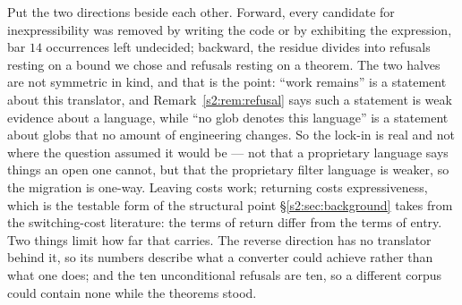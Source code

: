 Put the two directions beside each other. Forward, every candidate for inexpressibility was
removed by writing the code or by exhibiting the expression, bar $14$ occurrences left
undecided; backward, the residue divides into refusals resting on a bound we chose and
refusals resting on a theorem. The two halves are not symmetric in kind, and that is the
point: ``work remains'' is a statement about this translator, and
Remark~\ref{s2:rem:refusal} says such a statement is weak evidence about a language, while
``no glob denotes this language'' is a statement about globs that no amount of engineering
changes. So the lock-in is real and not where the question assumed it would be --- not that
a proprietary language says things an open one cannot, but that the proprietary filter
language is weaker, so the migration is one-way. Leaving costs work; returning costs
expressiveness, which is the testable form of the structural point
\S\ref{s2:sec:background} takes from the switching-cost literature: the terms of return
differ from the terms of entry. Two things limit how far that carries. The reverse direction
has no translator behind it, so its numbers describe what a converter could achieve rather
than what one does; and the ten unconditional refusals are ten, so a different corpus could
contain none while the theorems stood.
